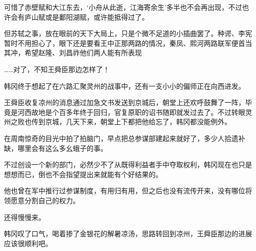 可惜了赤壁赋和大江东去，‘小舟从此逝，江海寄余生’多半也不会再出现，不过也许会有庐山赋或是鄱阳湖赋，或许能抵得过了。

但苏轼之事，放在眼前的天下大局上，只是个微不足道的小插曲罢了。种谔、李宪暂时不用担心了，眼下还是要看王中正那两路的情况，秦凤、熙河两路联军便首当其冲，希望赵隆、刘昌祚他们两人能有所表现

……对了，不知王舜臣那边怎样了！

韩冈终于想起了在六路汇聚灵州的战事中，还有一支小小的偏师正在向西进发。

王舜臣收复凉州的消息通过加急文书发送到京城后，朝堂上还欢呼鼓舞了一阵，毕竟是河西故地是个百多年终于回归，官复原职的诏书随即就发过去了。不过转眼灵州之败也传到京城，几天下来，朝堂上下都把他给忘了，韩冈都没能例外。

在周南惊奇的目光中拍了拍脑门，早点把总参谋部建起来就好了，多少人拾遗补缺，哪里会有这么多幺蛾子的事。

不过创设一个新的部门，必然少不了从既得利益者手中夺取权利，韩冈现在也只是想想而已，倒也不会指望提出来就能有个好结果的。

他也曾在军中推行过参谋制度，有用归有用，但之后也没有流传开来，没有哪位将领愿意分割自己的权力。

还得慢慢来。

韩冈叹了口气，喝着掺了金银花的解暑凉汤，思路转回到凉州，王舜臣那边的进展应该很顺利吧。

